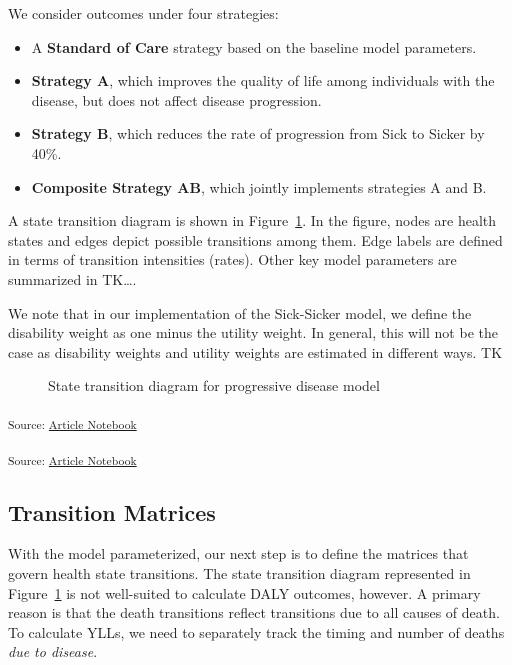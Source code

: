 \documentclass[
]{agujournal2019}
\providecommand{\tightlist}{%
  \setlength{\itemsep}{0pt}\setlength{\parskip}{0pt}}\usepackage{longtable,booktabs,array}
\begin{document}
We consider outcomes under four strategies:

\begin{itemize}
\tightlist
\item
  A \textbf{Standard of Care} strategy based on the baseline model
  parameters.
\item
  \textbf{Strategy A}, which improves the quality of life among
  individuals with the disease, but does not affect disease progression.
\item
  \textbf{Strategy B}, which reduces the rate of progression from Sick
  to Sicker by 40\%.
\item
  \textbf{Composite Strategy AB}, which jointly implements strategies A
  and B.
\end{itemize}

A state transition diagram is shown in Figure~\ref{fig-model1}. In the
figure, nodes are health states and edges depict possible transitions
among them. Edge labels are defined in terms of transition intensities
(rates). Other key model parameters are summarized in TK\ldots.

We note that in our implementation of the Sick-Sicker model, we define
the disability weight as one minus the utility weight. In general, this
will not be the case as disability weights and utility weights are
estimated in different ways. TK

\begin{figure}


\caption{\label{fig-model1}State transition diagram for progressive
disease model}

\end{figure}%

\textsubscript{Source:
\href{https://graveja0.github.io/dalys/index.qmd.html}{Article
Notebook}}

\textsubscript{Source:
\href{https://graveja0.github.io/dalys/index.qmd.html}{Article
Notebook}}

\subsection{Transition Matrices}\label{transition-matrices}

With the model parameterized, our next step is to define the matrices
that govern health state transitions. The state transition diagram
represented in Figure~\ref{fig-model1} is not well-suited to calculate
DALY outcomes, however. A primary reason is that the death transitions
reflect transitions due to all causes of death. To calculate YLLs, we
need to separately track the timing and number of deaths \emph{due to
disease}.
\end{document}
